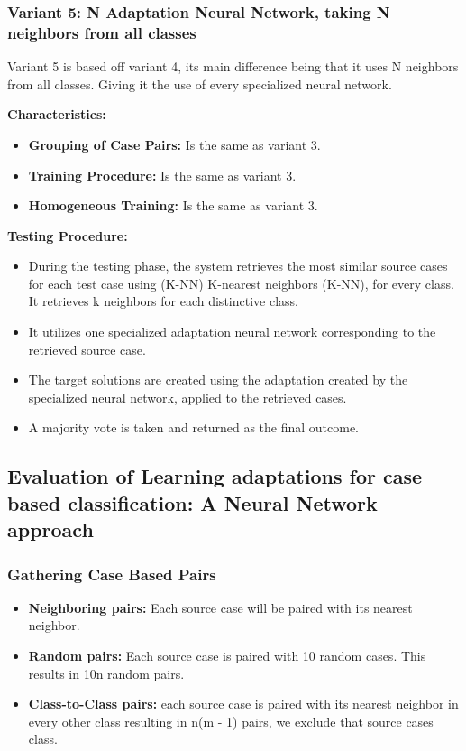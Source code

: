 \documentclass[a4paper, 12pt]{report}
\begin{document}
\subsubsection{Variant 5: N Adaptation Neural Network, taking N neighbors from all classes}

    Variant 5 is based off variant 4, its main difference being that it uses N neighbors from all classes. Giving it the use of every specialized neural network.
    
    \textbf{Characteristics:}
    
    \begin{itemize}
        \item \textbf{Grouping of Case Pairs:} Is the same as variant 3. 
        
        \item \textbf{Training Procedure:} Is the same as variant 3. 
        
        \item \textbf{Homogeneous Training:} Is the same as variant 3. 
    \end{itemize}
    
    \textbf{Testing Procedure:}
    
    \begin{itemize}
        \item During the testing phase, the system retrieves the most similar source cases for each test case using (K-NN) K-nearest neighbors (K-NN), for every class. It retrieves k neighbors for each distinctive class.
        \item It utilizes one specialized adaptation neural network corresponding to the retrieved source case.
        \item The target solutions are created using the adaptation created by the specialized neural network, applied to the retrieved cases.
        \item A majority vote is taken and returned as the final outcome.
\end{itemize}

\subsection{Evaluation of Learning adaptations for case based classification: A Neural Network approach}
\subsubsection{Gathering Case Based Pairs}
\begin{itemize}
    \item \textbf{Neighboring pairs:} Each source case will be paired with its nearest neighbor.
    \item \textbf{Random pairs:} Each source case is paired with 10 random cases. This results in 10n random pairs.
    \item \textbf{Class-to-Class pairs:} each source case is paired with its  nearest neighbor in every other class resulting in n(m - 1) pairs, we exclude that source cases class.
\end{itemize}
\end{document}
